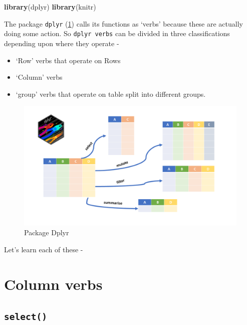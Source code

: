 \documentclass[
]{book}
\newenvironment{Shaded}{\begin{snugshade}}{\end{snugshade}}
\newcommand{\FunctionTok}[1]{\textcolor[rgb]{0.13,0.29,0.53}{\textbf{#1}}}
\newcommand{\NormalTok}[1]{#1}
\providecommand{\tightlist}{%
  \setlength{\itemsep}{0pt}\setlength{\parskip}{0pt}}
\begin{document}
\begin{Shaded}
\begin{Highlighting}[]
\FunctionTok{library}\NormalTok{(dplyr)}
\FunctionTok{library}\NormalTok{(knitr)}
\end{Highlighting}
\end{Shaded}

The package \texttt{dplyr} (\ref{fig:dplyrr}) calls its functions as `verbs' because these are actually doing some action. So \texttt{dplyr\ verbs} can be divided in three classifications depending upon where they operate -

\begin{itemize}
\tightlist
\item
  `Row' verbs that operate on Rows
\item
  `Column' verbs
\item
  `group' verbs that operate on table split into different groups.
\end{itemize}

\begin{figure}

{\centering \includegraphics[width=0.99\linewidth]{images/dplyr} 

}

\caption{Package Dplyr}\label{fig:dplyrr}
\end{figure}

Let's learn each of these -

\hypertarget{column-verbs}{%
\section{Column verbs}\label{column-verbs}}

\hypertarget{select}{%
\subsection{\texorpdfstring{\texttt{select()}}{select()}}\label{select}}
\end{document}
